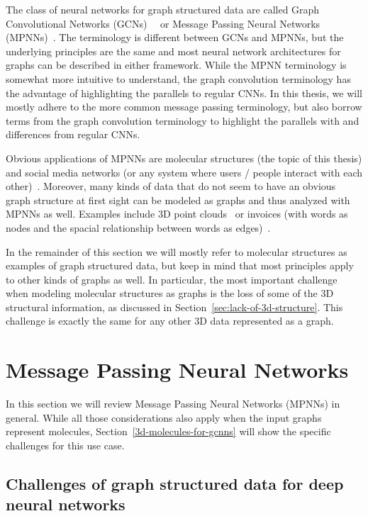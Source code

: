 The class of neural networks for graph structured data are called Graph Convolutional Networks (GCNs)~\cite{Kipf2017}~\cite{Schutt2017} or Message Passing Neural Networks (MPNNs)~\cite{Gilmer2017}. The terminology is different between GCNs and MPNNs, but the underlying principles are the same and most neural network architectures for graphs can be described in either framework. While the MPNN terminology is somewhat more intuitive to understand, the graph convolution terminology has the advantage of highlighting the parallels to regular CNNs. In this thesis, we will mostly adhere to the more common message passing terminology, but also borrow terms from the graph convolution terminology to highlight the parallels with and differences from regular CNNs.

Obvious applications of MPNNs are molecular structures (the topic of this thesis) and social media networks (or any system where users / people interact with each other)~\cite{Zhou2018}. Moreover, many kinds of data that do not seem to have an obvious graph structure at first sight can be modeled as graphs and thus analyzed with MPNNs as well. Examples include 3D point clouds~\cite{Charles2017} or invoices (with words as nodes and the spacial relationship between words as edges)~\cite{Riba2019}.

In the remainder of this section we will mostly refer to molecular structures as examples of graph structured data, but keep in mind that most principles apply to other kinds of graphs as well. In particular, the most important challenge when modeling molecular structures as graphs is the loss of some of the 3D structural information, as discussed in Section~\ref{sec:lack-of-3d-structure}. This challenge is exactly the same for any other 3D data represented as a graph.

\section{Message Passing Neural Networks}

In this section we will review Message Passing Neural Networks (MPNNs) in general. While all those considerations also apply when the input graphs represent molecules, Section~\ref{3d-molecules-for-gcnns} will show the specific challenges for this use case.

\subsection{Challenges of graph structured data for deep neural networks}
\label{sec:graph-challenges}

